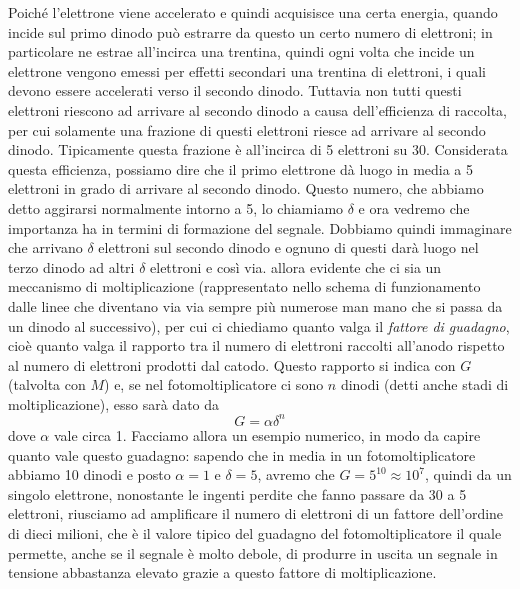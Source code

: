 Poiché l'elettrone viene accelerato e quindi acquisisce una certa energia, quando incide sul primo dinodo può estrarre da questo un certo numero di elettroni; in particolare ne estrae all'incirca una trentina, quindi ogni volta che incide un elettrone vengono emessi per effetti secondari una trentina di elettroni, i quali devono essere accelerati verso il secondo dinodo. Tuttavia non tutti questi elettroni riescono ad arrivare al secondo dinodo a causa dell'efficienza di raccolta, per cui solamente una frazione di questi elettroni riesce ad arrivare al secondo dinodo. Tipicamente questa frazione è all'incirca di 5 elettroni su 30. Considerata questa efficienza, possiamo dire che il primo elettrone dà luogo in media a 5 elettroni in grado di arrivare al secondo dinodo. Questo numero, che abbiamo detto aggirarsi normalmente intorno a 5, lo chiamiamo $\delta$ e ora vedremo che importanza ha in termini di formazione del segnale. Dobbiamo quindi immaginare che arrivano $\delta$ elettroni sul secondo dinodo e ognuno di questi darà luogo nel terzo dinodo ad altri $\delta$ elettroni e così via. \E allora evidente che ci sia un meccanismo di moltiplicazione (rappresentato nello schema di funzionamento dalle linee che diventano via via sempre più numerose man mano che si passa da un dinodo al successivo), per cui ci chiediamo quanto valga il \textit{fattore di guadagno}, cioè quanto valga il rapporto tra il numero di elettroni raccolti all'anodo rispetto al numero di elettroni prodotti dal catodo. Questo rapporto si indica con $G$ (talvolta con $M$) e, se nel fotomoltiplicatore ci sono $n$ dinodi (detti anche stadi di moltiplicazione), esso sarà dato da
\begin{equation*}
   G=\alpha \delta^n
\end{equation*}
dove $\alpha$ vale circa 1. Facciamo allora un esempio numerico, in modo da capire quanto vale questo guadagno: sapendo che in media in un fotomoltiplicatore abbiamo 10 dinodi e posto $\alpha=1$ e $\delta=5$, avremo che $G=5^{10}\approx 10^7$, quindi da un singolo elettrone, nonostante le ingenti perdite che fanno passare da 30 a 5 elettroni, riusciamo ad amplificare il numero di elettroni di un fattore dell'ordine di dieci milioni, che è il valore tipico del guadagno del fotomoltiplicatore il quale permette, anche se il segnale è molto debole, di produrre in uscita un segnale in tensione abbastanza elevato grazie a questo fattore di moltiplicazione.

